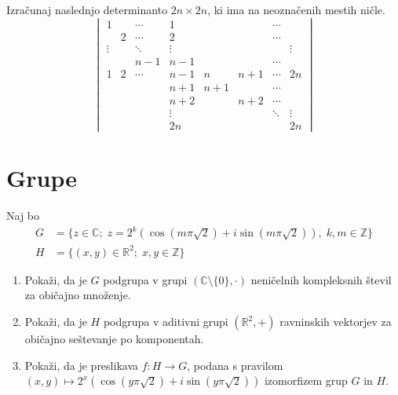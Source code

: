 \documentclass[a4paper,12pt]{article}
\begin{document}
Izračunaj naslednjo determinanto \(2n \times 2n\), ki ima na neoznačenih mestih ničle.
\[
\begin{vmatrix}
1 & & \cdots & 1 & & & \cdots & \\
& 2 & \cdots & 2 & & & \cdots & \\
\vdots & & \ddots & \vdots & & & & \vdots \\
& & n-1 & n-1 & & & \cdots & \\
1 & 2 & \cdots & n-1 & n & n+1 & \cdots & 2n \\
& & & n+1 & n+1 & & \cdots & \\
& & & n+2 & & n+2 & \cdots & \\
& & & \vdots & & & \ddots & \vdots \\
& & & 2n & & & & 2n
\end{vmatrix}
\]
%
%

\section*{Grupe}

Naj bo
\begin{align*}
G &= \{z \in \mathbb{C};\; z = 2^k(\cos(m\pi\sqrt{2}) + i\sin(m\pi\sqrt{2})),\; k,m \in \mathbb{Z}\} \\
H &= \{(x,y) \in \mathbb{R}^2;\; x,y \in \mathbb{Z}\}
\end{align*}
\begin{enumerate}
\item
Pokaži, da je \(G\) podgrupa v grupi \((\mathbb{C} \setminus \{0\}, \cdot)\)
neničelnih kompleksnih števil za običajno množenje.

\item
Pokaži, da je \(H\) podgrupa v aditivni grupi \((\mathbb{R}^2, +)\)
ravninskih vektorjev za običajno seštevanje po komponentah.

\item
Pokaži, da je preslikava \(f:H\to G\), podana s pravilom
\((x,y) \mapsto 2^x(\cos(y\pi\sqrt{2}) + i\sin(y\pi\sqrt{2}))\)
izomorfizem grup \(G\) in \(H\).
\end{enumerate}
\end{document}
